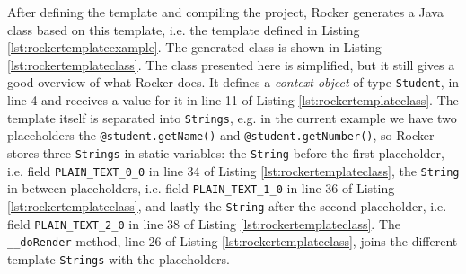 \noindent
After defining the template and compiling the project, Rocker generates a Java class based on this template, i.e. the template defined in Listing \ref{lst:rockertemplateexample}. The generated class is shown in Listing \ref{lst:rockertemplateclass}. The class presented here is simplified, but it still gives a good overview of what Rocker does. It defines a \textit{context object} of type \texttt{Student}, in line 4 and receives a value for it in line 11 of Listing \ref{lst:rockertemplateclass}. The template itself is separated into \texttt{Strings}, e.g. in the current example we have two placeholders the \texttt{@student.getName()} and \texttt{@student.getNumber()}, so Rocker stores three \texttt{Strings} in static variables: the \texttt{String} before the first placeholder, i.e. field \texttt{PLAIN\_TEXT\_0\_0} in line 34 of Listing \ref{lst:rockertemplateclass}, the \texttt{String} in between placeholders, i.e. field \texttt{PLAIN\_TEXT\_1\_0} in line 36 of Listing \ref{lst:rockertemplateclass}, and lastly the \texttt{String} after the second placeholder, i.e. field \texttt{PLAIN\_TEXT\_2\_0} in line 38 of Listing \ref{lst:rockertemplateclass}. The \texttt{\_\_doRender} method, line 26 of Listing \ref{lst:rockertemplateclass}, joins the different template \texttt{Strings} with the placeholders.

\bigskip


